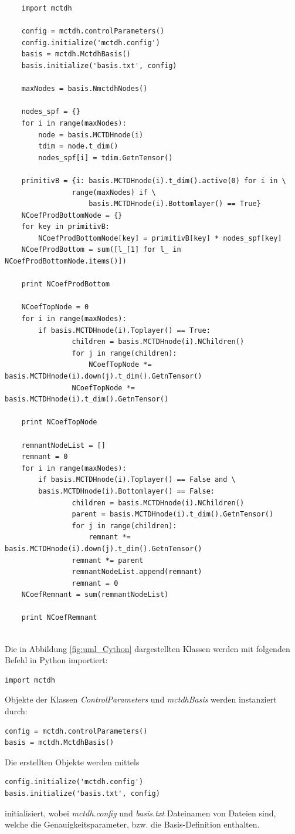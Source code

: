 \begin{verbatim}
    import mctdh

    config = mctdh.controlParameters()
    config.initialize('mctdh.config')
    basis = mctdh.MctdhBasis()
    basis.initialize('basis.txt', config)
    
    maxNodes = basis.NmctdhNodes()
    
    nodes_spf = {}
    for i in range(maxNodes):
        node = basis.MCTDHnode(i)
        tdim = node.t_dim()
        nodes_spf[i] = tdim.GetnTensor() 
    
    primitivB = {i: basis.MCTDHnode(i).t_dim().active(0) for i in \
                range(maxNodes) if \
                    basis.MCTDHnode(i).Bottomlayer() == True}
    NCoefProdBottomNode = {}
    for key in primitivB:
        NCoefProdBottomNode[key] = primitivB[key] * nodes_spf[key]
    NCoefProdBottom = sum([l_[1] for l_ in NCoefProdBottomNode.items()])
    
    print NCoefProdBottom

    NCoefTopNode = 0
    for i in range(maxNodes):
        if basis.MCTDHnode(i).Toplayer() == True:
                children = basis.MCTDHnode(i).NChildren()
                for j in range(children):
                    NCoefTopNode *= basis.MCTDHnode(i).down(j).t_dim().GetnTensor()
                NCoefTopNode *= basis.MCTDHnode(i).t_dim().GetnTensor()
    
    print NCoefTopNode
    
    remnantNodeList = []
    remnant = 0
    for i in range(maxNodes):
        if basis.MCTDHnode(i).Toplayer() == False and \
        basis.MCTDHnode(i).Bottomlayer() == False:
                children = basis.MCTDHnode(i).NChildren()
                parent = basis.MCTDHnode(i).t_dim().GetnTensor()
                for j in range(children):
                    remnant *= basis.MCTDHnode(i).down(j).t_dim().GetnTensor() 
                remnant *= parent
                remnantNodeList.append(remnant)
                remnant = 0
    NCoefRemnant = sum(remnantNodeList)
    
    print NCoefRemnant
    
\end{verbatim}

Die in Abbildung \ref{fig:uml_Cython} dargestellten Klassen werden mit folgenden Befehl in Python importiert:

\begin{verbatim}
import mctdh
\end{verbatim}
Objekte der Klassen \textit{ControlParameters} und \textit{mctdhBasis} werden instanziert durch:
\begin{verbatim}
config = mctdh.controlParameters()
basis = mctdh.MctdhBasis()
\end{verbatim}
Die erstellten Objekte werden mittels
\begin{verbatim}
config.initialize('mctdh.config')
basis.initialize('basis.txt', config)
\end{verbatim}
initialisiert, wobei \textit{mctdh.config} und \textit{basis.txt} Dateinamen von Dateien sind, 
welche die Genauigkeitsparameter, bzw. die Basis-Definition enthalten.

